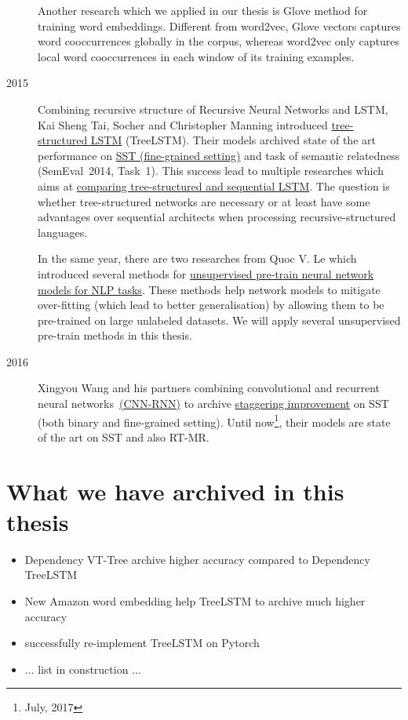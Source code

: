 \begin{description}
Another research which we applied in our thesis is Glove method for training word embeddings\cite{glove}.
Different from word2vec, Glove vectors captures word cooccurrences globally in the corpus, whereas word2vec only captures local word cooccurrences in each window of its training examples\cite{glove}.

\item [2015] Combining recursive structure of Recursive Neural Networks\cite{socher2013recursive} and LSTM\cite{originLSTM}, Kai Sheng Tai, Socher and Christopher Manning introduced \hyperref[sec:treelstm]{tree-structured LSTM}  (TreeLSTM)\cite{treeLSTM}.
Their models archived state of the art performance on \hyperref[sec:sst]{SST (fine-grained setting)} and task of semantic relatedness (SemEval~2014, Task~1\cite{SemeEvalTask1}).
This success lead to multiple researches\cite{need-tree}\cite{bowman-treevslstm}\cite{Graves_Nature2016} which aims at \hyperref[treelstm-advantage]{comparing tree-structured and sequential LSTM}. 
The question is whether tree-structured networks are necessary or at least have some advantages over sequential architects when processing recursive-structured languages\cite{need-tree}\cite{bowman-treevslstm}.   

In the same year, there are two researches\cite{ParagraphVec}\cite{semisup-seq2seq} from Quoc V. Le which introduced several methods for \hyperref[sec:unsupervised-pretrain]{unsupervised pre-train neural network models for NLP tasks}.
These methods help network models to mitigate over-fitting (which lead to better generalisation) by allowing them to be pre-trained on large unlabeled datasets.
We will apply several unsupervised pre-train methods in this thesis.

\item [2016] Xingyou Wang and his partners combining convolutional and recurrent neural networks~\hyperref[cnn-rnn]{(CNN-RNN)} to archive \hyperref[table:cnn-rnn]{staggering improvement} on SST (both binary and fine-grained setting).
Until now\footnote{July, 2017}, their models are state of the art on SST and also RT-MR\cite{cnn-rnn}.
\end{description}  

\section{What we have archived in this thesis}
\begin{itemize}
\item Dependency VT-Tree archive higher accuracy compared to Dependency TreeLSTM
\item New Amazon word embedding help TreeLSTM to archive much higher accuracy
\item successfully re-implement TreeLSTM on Pytorch
\item ... list in construction ...
\end{itemize}

